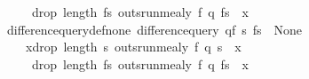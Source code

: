 {\ \ \ \ \ \ drop\ {\isacharparenleft}{\kern0pt}length\ fs{\isacharparenright}{\kern0pt}\ {\isacharparenleft}{\kern0pt}outs{\isacharunderscore}{\kern0pt}run{\isacharunderscore}{\kern0pt}mealy\ f\ q{\isacharunderscore}{\kern0pt}{}\ {\isacharparenleft}{\kern0pt}fs\ {\isacharat}{\kern0pt}\ x{\isacharparenright}{\kern0pt}{\isacharparenright}{\kern0pt}{\isacharparenright}{\kern0pt}{\isachardoublequoteclose}\ \isanewline
\ \ difference{\isacharunderscore}{\kern0pt}query{\isacharunderscore}{\kern0pt}def{\isacharunderscore}{\kern0pt}none{\isacharcolon}{\kern0pt}\ {\isachardoublequoteopen}{\isacharparenleft}{\kern0pt}difference{\isacharunderscore}{\kern0pt}query\ {\isacharparenleft}{\kern0pt}q{\isacharunderscore}{\kern0pt}{}{\isacharcomma}{\kern0pt}f{\isacharparenright}{\kern0pt}\ s\ fs\ {\isacharequal}{\kern0pt}\ None{\isacharparenright}{\kern0pt}\ {\isasymlongleftrightarrow}\ \isanewline
\ \ \ \ {\isacharparenleft}{\kern0pt}{\isasymnexists}\ x{\isachardot}{\kern0pt}{\isacharparenleft}{\kern0pt}drop\ {\isacharparenleft}{\kern0pt}length\ s{\isacharparenright}{\kern0pt}\ {\isacharparenleft}{\kern0pt}outs{\isacharunderscore}{\kern0pt}run{\isacharunderscore}{\kern0pt}mealy\ f\ q{\isacharunderscore}{\kern0pt}{}\ {\isacharparenleft}{\kern0pt}s\ {\isacharat}{\kern0pt}\ x{\isacharparenright}{\kern0pt}{\isacharparenright}{\kern0pt}\ {\isasymnoteq}\isanewline
\ \ \ \ \ \ drop\ {\isacharparenleft}{\kern0pt}length\ fs{\isacharparenright}{\kern0pt}\ {\isacharparenleft}{\kern0pt}outs{\isacharunderscore}{\kern0pt}run{\isacharunderscore}{\kern0pt}mealy\ f\ q{\isacharunderscore}{\kern0pt}{}\ {\isacharparenleft}{\kern0pt}fs\ {\isacharat}{\kern0pt}\ x{\isacharparenright}{\kern0pt}{\isacharparenright}{\kern0pt}{\isacharparenright}{\kern0pt}{\isacharparenright}{\kern0pt}{\isachardoublequoteclose}\ \isanewline
{}%
}%
